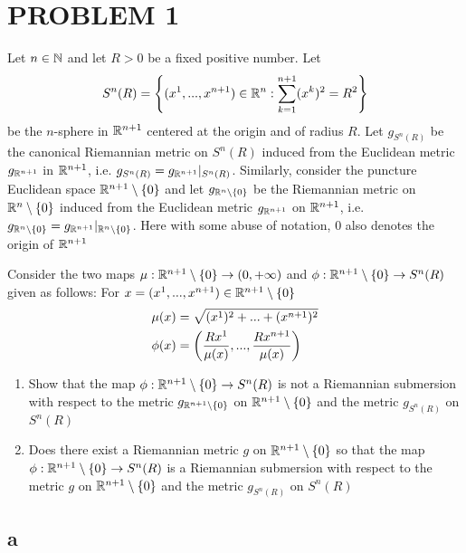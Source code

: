 \section{PROBLEM 1}

\begin{problem}
	Let $n \in \N$ and let $R > 0$ be a fixed positive number. Let
	$$
		S^n(R) = \set*{(x^1, ..., x^{n+1}) \in \R^n: \sum_{k=1}^{n+1} (x^k)^2 = R^2}
	$$
	be the $n$-sphere in $\R^{n+1}$ centered at the origin and of radius $R$. Let $g_{S^n(R)}$ be the canonical Riemannian metric on $S^n(R)$ induced from the Euclidean metric $g_{\R^{n+1}}$ in $\R^{n+1}$, i.e. $g_{S^n(R)} = g_{\R^{n+1}} \vert_{S^n(R)}$. Similarly, consider the puncture Euclidean space $\R^{n+1} \setminus \set{0}$ and let $g_{\R^n \setminus \set{0}}$ be the Riemannian metric on $\R^n \setminus \set{0}$ induced from the Euclidean metric $g_{\R^{n+1}}$ on $\R^{n+1}$, i.e. $g_{\R^n \setminus \set{0}} = g_{\R^{n+1}} \vert_{\R^n \setminus \set{0}}$. Here with some abuse of notation, $0$ also denotes the origin of $\R^{n+1}$
	
	Consider the two maps $\mu: \R^{n+1} \setminus \set{0} \to (0, +\infty)$ and $\phi: \R^{n+1} \setminus \set{0} \to S^n(R)$ given as follows: For $x = (x^1, ..., x^{n+1}) \in \R^{n+1} \setminus \set{0}$
	\begin{align*}
		\mu(x) &= \sqrt{(x^1)^2 + ... + (x^{n+1})^2}\\
		\phi(x) &= \tuple*{\frac{R x^1}{\mu(x)}, ..., \frac{R x^{n+1}}{\mu(x)}}
	\end{align*}
	
	\begin{enumerate}[label=(\alph*)]
		\item Show that the map $\phi: \R^{n+1} \setminus \set{0} \to S^n(R)$ is not a Riemannian submersion with respect to the metric $g_{\R^{n+1} \setminus \set{0}}$ on $\R^{n+1} \setminus \set{0}$ and the metric $g_{S^n(R)}$ on $S^n(R)$
		
		\item Does there exist a Riemannian metric $g$ on $\R^{n+1} \setminus \set{0}$ so that the map $\phi: \R^{n+1} \setminus \set{0} \to S^n(R)$ is a Riemannian submersion with respect to the metric $g$ on $\R^{n+1} \setminus \set{0}$ and the metric $g_{S^n(R)}$ on $S^n(R)$
	\end{enumerate}
\end{problem}

\subsection{a}

